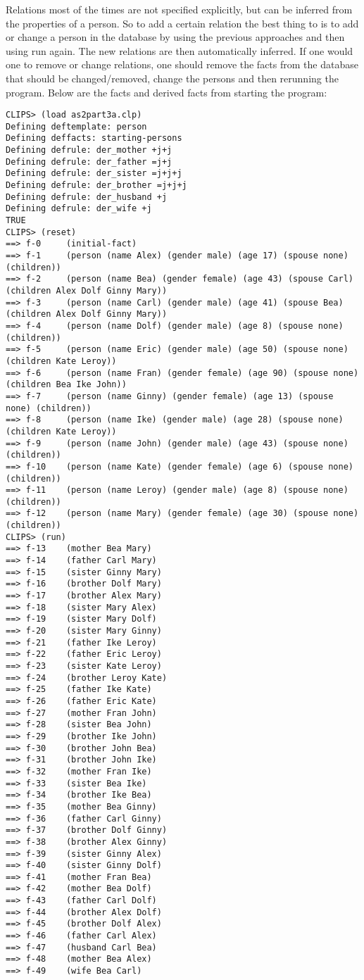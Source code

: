 \documentclass[a4paper]{article}
\begin{document}
Relations most of the times are not specified explicitly, but can be inferred from the properties of a person. So to add a certain relation the best thing to is to add or change a person in the database by using the previous approaches and then using run again. The new relations are then automatically inferred. If one would one to remove or change relations, one should remove the facts from the database that should be changed/removed, change the persons and then rerunning the program. Below are the facts and derived facts from starting the program:
\begin{Verbatim}[fontsize=\scriptsize]
CLIPS> (load as2part3a.clp)
Defining deftemplate: person
Defining deffacts: starting-persons
Defining defrule: der_mother +j+j
Defining defrule: der_father =j+j
Defining defrule: der_sister =j+j+j
Defining defrule: der_brother =j+j+j
Defining defrule: der_husband +j
Defining defrule: der_wife +j
TRUE
CLIPS> (reset)
==> f-0     (initial-fact)
==> f-1     (person (name Alex) (gender male) (age 17) (spouse none) (children))
==> f-2     (person (name Bea) (gender female) (age 43) (spouse Carl) (children Alex Dolf Ginny Mary))
==> f-3     (person (name Carl) (gender male) (age 41) (spouse Bea) (children Alex Dolf Ginny Mary))
==> f-4     (person (name Dolf) (gender male) (age 8) (spouse none) (children))
==> f-5     (person (name Eric) (gender male) (age 50) (spouse none) (children Kate Leroy))
==> f-6     (person (name Fran) (gender female) (age 90) (spouse none) (children Bea Ike John))
==> f-7     (person (name Ginny) (gender female) (age 13) (spouse none) (children))
==> f-8     (person (name Ike) (gender male) (age 28) (spouse none) (children Kate Leroy))
==> f-9     (person (name John) (gender male) (age 43) (spouse none) (children))
==> f-10    (person (name Kate) (gender female) (age 6) (spouse none) (children))
==> f-11    (person (name Leroy) (gender male) (age 8) (spouse none) (children))
==> f-12    (person (name Mary) (gender female) (age 30) (spouse none) (children))
CLIPS> (run)
==> f-13    (mother Bea Mary)
==> f-14    (father Carl Mary)
==> f-15    (sister Ginny Mary)
==> f-16    (brother Dolf Mary)
==> f-17    (brother Alex Mary)
==> f-18    (sister Mary Alex)
==> f-19    (sister Mary Dolf)
==> f-20    (sister Mary Ginny)
==> f-21    (father Ike Leroy)
==> f-22    (father Eric Leroy)
==> f-23    (sister Kate Leroy)
==> f-24    (brother Leroy Kate)
==> f-25    (father Ike Kate)
==> f-26    (father Eric Kate)
==> f-27    (mother Fran John)
==> f-28    (sister Bea John)
==> f-29    (brother Ike John)
==> f-30    (brother John Bea)
==> f-31    (brother John Ike)
==> f-32    (mother Fran Ike)
==> f-33    (sister Bea Ike)
==> f-34    (brother Ike Bea)
==> f-35    (mother Bea Ginny)
==> f-36    (father Carl Ginny)
==> f-37    (brother Dolf Ginny)
==> f-38    (brother Alex Ginny)
==> f-39    (sister Ginny Alex)
==> f-40    (sister Ginny Dolf)
==> f-41    (mother Fran Bea)
==> f-42    (mother Bea Dolf)
==> f-43    (father Carl Dolf)
==> f-44    (brother Alex Dolf)
==> f-45    (brother Dolf Alex)
==> f-46    (father Carl Alex)
==> f-47    (husband Carl Bea)
==> f-48    (mother Bea Alex)
==> f-49    (wife Bea Carl)
\end{Verbatim}
\end{document}
